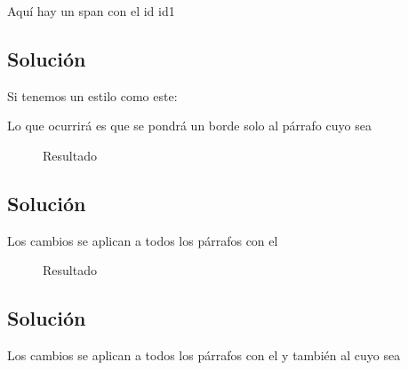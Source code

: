 \documentclass[letterpaper,10pt,spanish]{sphinxmanual}
\begin{document}
\begin{sphinxVerbatim}[commandchars=\\\{\}]
 
        Aquí hay un
         
                span con el id id1
\end{sphinxVerbatim}


\subsection{Solución }
\label{\detokenize{tema3:solucion-p-destacado}}
Si tenemos un estilo como este:

\begin{sphinxVerbatim}[commandchars=\\\{\}]
          
\end{sphinxVerbatim}

Lo que ocurrirá es que se pondrá un borde solo al párrafo cuyo  sea 

\begin{figure}[htbp]
\centering
\capstart

\noindent{}
\caption{Resultado}\label{\detokenize{tema3:id16}}\end{figure}


\subsection{Solución }
\label{\detokenize{tema3:id5}}
Los cambios se aplican a todos los párrafos con el  

\begin{figure}[htbp]
\centering
\capstart

\noindent{}
\caption{Resultado}\label{\detokenize{tema3:id17}}\end{figure}


\subsection{Solución }
\label{\detokenize{tema3:solucion-p-destacado-span-id1}}
Los cambios se aplican a todos los párrafos con el   y también al  cuyo  sea 
\end{document}

